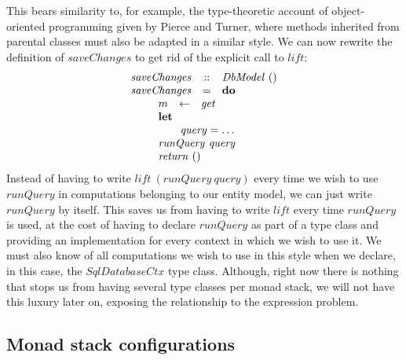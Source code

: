 This bears similarity to, for example, the type-theoretic account of object-oriented programming given by Pierce and Turner\cite{pierce1994simple}, where methods inherited from parental classes must also be adapted in a similar style. We can now rewrite the definition of $\mathit{saveChanges}$ to get rid of the explicit call to $\mathit{lift}$:
\begin{displaymath}
\begin{array}{lcl}
\mathit{saveChanges} & :: & \mathit{DbModel}~() \\
\mathit{saveChanges} & = & \mathbf{do} \\
\multicolumn{3}{l}{\qquad \begin{array}{lcl}
    m & \leftarrow & \mathit{get} \\
    \multicolumn{3}{l}{\mathbf{let}} \\
    \multicolumn{3}{l}{\qquad \mathit{query} = \ldots} \\
    \multicolumn{3}{l}{\mathit{runQuery}~\mathit{query}}\\
    \multicolumn{3}{l}{\mathit{return}~()}
\end{array} }
\end{array}
\end{displaymath}
Instead of having to write $\mathit{lift}~(\mathit{runQuery}~\mathit{query})$ every time we wish to use $\mathit{runQuery}$ in computations belonging to our entity model, we can just write $\mathit{runQuery}$ by itself. This saves us from having to write $\mathit{lift}$ every time $\mathit{runQuery}$ is used, at the cost of having to declare $\mathit{runQuery}$ as part of a type class and providing an implementation for every context in which we wish to use it. We must also know of all computations we wish to use in this style when we declare, in this case, the $\mathit{SqlDatabaseCtx}$ type class. Although, right now there is nothing that stops us from having several type classes per monad stack, we will not have this luxury later on, exposing the relationship to the expression problem.

\subsection{Monad stack configurations}
\label{sec:configurations}

